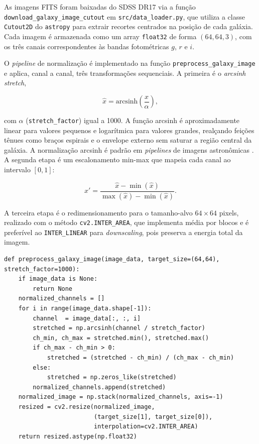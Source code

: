 \documentclass[12pt, a4paper]{article}
\begin{document}
As imagens FITS foram baixadas do SDSS DR17 via a função
\texttt{download\_galaxy\_image\_cutout} em \texttt{src/data\_loader.py},
que utiliza a classe \texttt{Cutout2D} do \texttt{astropy} para extrair
recortes centrados na posição de cada galáxia. Cada imagem é armazenada como
um array \texttt{float32} de forma $(64, 64, 3)$, com os três canais
correspondentes às bandas fotométricas $g$, $r$ e $i$.

O \textit{pipeline} de normalização é implementado na função
\texttt{preprocess\_galaxy\_image} e aplica, canal a canal, três
transformações sequenciais. A primeira é o \textit{arcsinh stretch},

\begin{equation}
  \hat{x} = \text{arcsinh}\!\left(\frac{x}{\alpha}\right),
\end{equation}

com $\alpha$ (\texttt{stretch\_factor}) igual a 1000. A função arcsinh é
aproximadamente linear para valores pequenos e logarítmica para valores
grandes, realçando feições tênues como braços espirais e o envelope externo
sem saturar a região central da galáxia. A normalização arcsinh é padrão em
\textit{pipelines} de imagens astronômicas \cite{lupton2004}. A segunda
etapa é um escalonamento min-max que mapeia cada canal ao intervalo $[0,1]$:

\begin{equation}
  x' = \frac{\hat{x} - \min(\hat{x})}{\max(\hat{x}) - \min(\hat{x})}.
\end{equation}

A terceira etapa é o redimensionamento para o tamanho-alvo $64 \times 64$
pixels, realizado com o método \texttt{cv2.INTER\_AREA}, que implementa
média por blocos e é preferível ao \texttt{INTER\_LINEAR} para
\textit{downscaling}, pois preserva a energia total da imagem.

\begin{lstlisting}[caption={Implementação do pipeline de pré-processamento de imagens.}, label=lst:preproc_img]
def preprocess_galaxy_image(image_data, target_size=(64,64), stretch_factor=1000):
    if image_data is None:
        return None
    normalized_channels = []
    for i in range(image_data.shape[-1]):
        channel  = image_data[:, :, i]
        stretched = np.arcsinh(channel / stretch_factor)
        ch_min, ch_max = stretched.min(), stretched.max()
        if ch_max - ch_min > 0:
            stretched = (stretched - ch_min) / (ch_max - ch_min)
        else:
            stretched = np.zeros_like(stretched)
        normalized_channels.append(stretched)
    normalized_image = np.stack(normalized_channels, axis=-1)
    resized = cv2.resize(normalized_image,
                         (target_size[1], target_size[0]),
                         interpolation=cv2.INTER_AREA)
    return resized.astype(np.float32)
\end{lstlisting}
\end{document}
